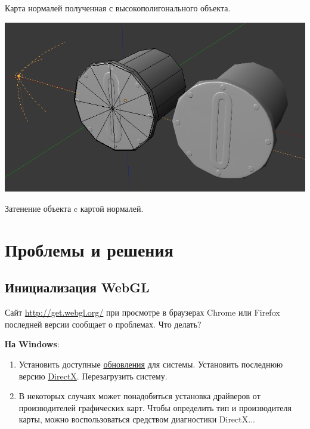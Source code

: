 \documentclass[a4paper,12pt,oneside]{sphinxmanual}
\begin{document}
Карта нормалей полученная с высокополигонального объекта.

{\hfill\includegraphics[width=1.000\linewidth]{normals_5.png}\hfill}

Затенение объекта c картой нормалей.


\chapter{Проблемы и решения}
\label{problems_and_solutions:problems-and-solutions}\label{problems_and_solutions::doc}\label{problems_and_solutions:id1}

\section{Инициализация WebGL}
\label{problems_and_solutions:webgl}\label{problems_and_solutions:webgl-not-working}
Сайт \href{http://get.webgl.org/}{http://get.webgl.org/} при просмотре в браузерах Chrome или Firefox последней версии сообщает о проблемах. Что делать?

\textbf{На Windows}:
\begin{enumerate}
\item {} 
Установить доступные \href{http://support.microsoft.com/kb/311047/ru}{обновления} для системы. Установить последнюю версию \href{http://www.microsoft.com/downloads/ru-ru/details.aspx?FamilyID=2da43d38-db71-4c1b-bc6a-9b6652cd92a3\&displayLang=ru}{DirectX}. Перезагрузить систему.

\item {} 
В некоторых случаях может понадобиться установка драйверов от производителей графических карт. Чтобы определить тип и производителя карты, можно воспользоваться средством диагностики DirectX...

\end{enumerate}
\end{document}
